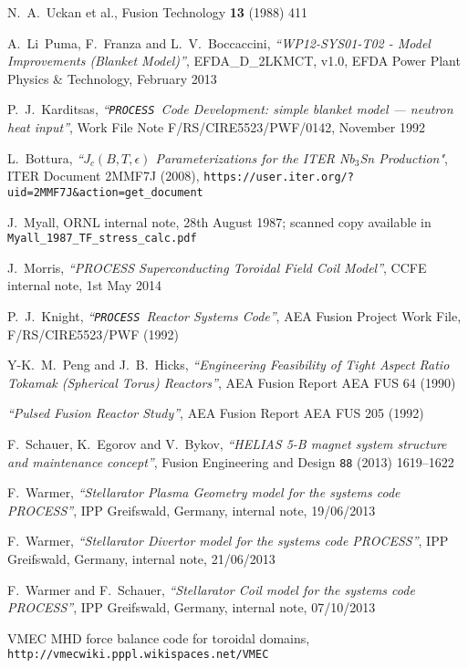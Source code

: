 \documentclass[11pt,a4paper]{report}
\newcommand{\process}{\mbox{\texttt{PROCESS}}}
\begin{document}
\begin{thebibliography}{99}
N.\ A.\ Uckan et al.,
Fusion Technology \textbf{13} (1988) 411

A.\ Li~Puma, F.\ Franza and L.\ V.\ Boccaccini, \textit{``WP12-SYS01-T02 -
  Model Improvements (Blanket Model)''},
EFDA\_D\_2LKMCT, v1.0, EFDA Power Plant Physics \& Technology, February 2013

P.\ J.\ Karditsas, \textit{``\process\ Code Development: simple blanket model ---
neutron heat input''},
Work File Note F/RS/CIRE5523/PWF/0142, November 1992

L.\ Bottura,
\textit{``$J_c(B,T,\epsilon)$ Parameterizations for the ITER Nb$_3$Sn
  Production"},
ITER Document 2MMF7J (2008),
\texttt{https://user.iter.org/?uid=2MMF7J\&action=get\_document}

J.\ Myall,
ORNL internal note, 28th August 1987; scanned copy available in
\texttt{Myall\_1987\_TF\_stress\_calc.pdf}

J.\ Morris,
\textit{``PROCESS Superconducting Toroidal Field Coil Model''},
CCFE internal note, 1st May 2014

P.\ J.\ Knight,
\textit{``\process\ Reactor Systems Code''},
AEA Fusion Project Work File, F/RS/CIRE5523/PWF
(1992)

Y-K.\ M.\ Peng and J.\ B.\ Hicks,
\textit{``Engineering Feasibility of Tight Aspect Ratio Tokamak
(Spherical Torus) Reactors''},
AEA Fusion Report AEA FUS 64 (1990)

\textit{``Pulsed Fusion Reactor Study''},
AEA Fusion Report AEA FUS 205
(1992)

F.\ Schauer, K.\ Egorov and V.\ Bykov,
\textit{``HELIAS 5-B magnet system structure and maintenance concept''},
Fusion Engineering and Design \texttt{88} (2013) 1619--1622

F.\ Warmer,
\textit{``Stellarator Plasma Geometry model for the systems code PROCESS''},
IPP Greifswald, Germany, internal note, 19/06/2013

F.\ Warmer,
\textit{``Stellarator Divertor model for the systems code PROCESS''},
IPP Greifswald, Germany, internal note, 21/06/2013

F.\ Warmer and F.\ Schauer,
\textit{``Stellarator Coil model for the systems code PROCESS''},
IPP Greifswald, Germany, internal note, 07/10/2013

VMEC MHD force balance code for toroidal domains,
\texttt{http://vmecwiki.pppl.wikispaces.net/VMEC}


\end{thebibliography}
\end{document}
